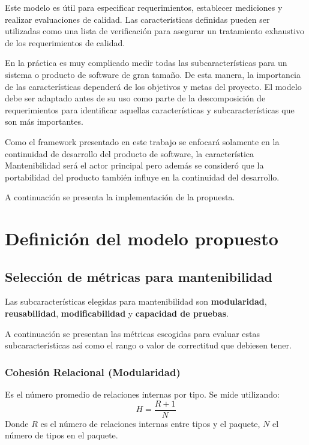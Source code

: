 Este modelo es útil para especificar requerimientos, establecer mediciones y
realizar evaluaciones de calidad. Las características definidas pueden ser utilizadas
como una lista de verificación para asegurar un tratamiento exhaustivo de
los requerimientos de calidad.

En la práctica es muy complicado medir todas las subcaracterísticas para un sistema
o producto de software de gran tamaño. De esta manera, la importancia de las
características dependerá de los objetivos y metas del proyecto. El modelo
debe ser adaptado antes de su uso como parte de la descomposición de requerimientos
para identificar aquellas características y subcaracterísticas que son más
importantes.

Como el framework presentado en este trabajo se enfocará solamente en la
continuidad de desarrollo del producto
de software, la característica Mantenibilidad será el actor principal pero además
se consideró que la portabilidad del producto también influye en la continuidad del desarrollo.

A continuación se presenta la implementación de la propuesta.

\section{Definición del modelo propuesto}

\subsection{Selección de métricas para mantenibilidad}
Las subcaracterísticas elegidas para mantenibilidad son \textbf{modularidad}, \textbf{reusabilidad},
\textbf{modificabilidad} y \textbf{capacidad de pruebas}.

A continuación se presentan las métricas escogidas para evaluar estas subcaracterísticas
así como el rango o valor de correctitud que debiesen tener.

\subsubsection{Cohesión Relacional (Modularidad)}
Es el número promedio de relaciones internas por tipo. Se mide utilizando:
\begin{equation*}
H=\frac{R+1}{N}
\end{equation*}
Donde $R$ es el número de relaciones internas entre tipos y el paquete, $N$ el número de tipos en el paquete.

